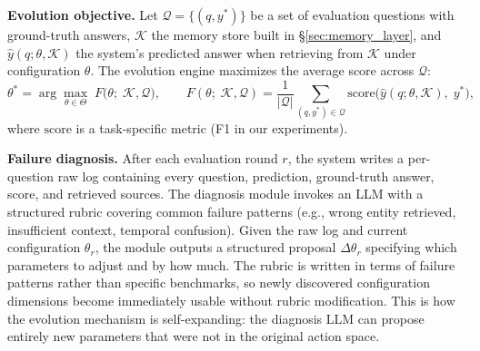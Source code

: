 \noindent \textbf{Evolution objective.} Let $\mathcal{Q} = \{(q, y^*)\}$ be a set of evaluation questions with ground-truth answers, $\mathcal{K}$ the memory store built in \S\ref{sec:memory_layer}, and $\hat{y}(q; \theta, \mathcal{K})$ the system's predicted answer when retrieving from $\mathcal{K}$ under configuration $\theta$. The evolution engine maximizes the average score across $\mathcal{Q}$:
\begin{equation}
    \theta^* = \arg\max_{\theta \in \Theta}\; F\bigl(\theta;\; \mathcal{K}, \mathcal{Q}\bigr),
    \qquad
    F(\theta;\; \mathcal{K}, \mathcal{Q}) = \frac{1}{|\mathcal{Q}|}\sum_{(q, y^*) \in \mathcal{Q}} \mathrm{score}\!\bigl(\hat{y}(q; \theta, \mathcal{K}),\; y^*\bigr),
    \label{eq:evolve_objective}
\end{equation}
where $\mathrm{score}$ is a task-specific metric (F1 in our experiments).

\noindent \textbf{Failure diagnosis.} After each evaluation round $r$, the system writes a per-question raw log containing every question, prediction, ground-truth answer, score, and retrieved sources. The diagnosis module invokes an LLM with a structured rubric covering common failure patterns (e.g., wrong entity retrieved, insufficient context, temporal confusion). Given the raw log and current configuration $\theta_r$, the module outputs a structured proposal $\Delta\theta_r$ specifying which parameters to adjust and by how much. The rubric is written in terms of failure patterns rather than specific benchmarks, so newly discovered configuration dimensions become immediately usable without rubric modification. This is how the evolution mechanism is self-expanding: the diagnosis LLM can propose entirely new parameters that were not in the original action space.

